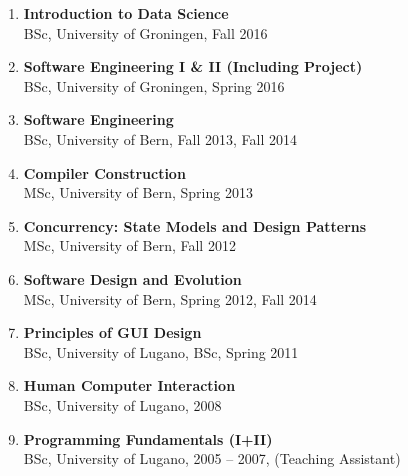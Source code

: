 \newcommand {\lecture}[3]{\item {\bf #1}\\#2, #3 }
\newcommand {\ug}{University of Groningen}
\newcommand {\ub}{University of Bern}
\newcommand {\ul}{University of Lugano}
\newcommand {\msc}{MSc, }
\newcommand {\bsc}{BSc, }

\begin{enumerate}
	\lecture{Introduction to Data Science}{\bsc \ug}{Fall 2016}
	\lecture{Software Engineering I \& II (Including Project)}{\bsc \ug}{Spring 2016}
	\lecture{Software Engineering}{\bsc \ub}{Fall 2013, Fall 2014}
	\lecture {Compiler Construction}{\msc \ub}{Spring 2013}
	\lecture {Concurrency: State Models and Design Patterns}{\msc \ub}{Fall 2012}
	\lecture {Software Design and Evolution}{\msc \ub}{Spring 2012, Fall 2014}
	\lecture {Principles of GUI Design}{\bsc \ul}{\bsc Spring 2011}
	\lecture {Human Computer Interaction}{\bsc \ul}{2008}
	\lecture {Programming Fundamentals (I+II)}{\bsc \ul}{2005 -- 2007, (Teaching Assistant)}

\end{enumerate}
